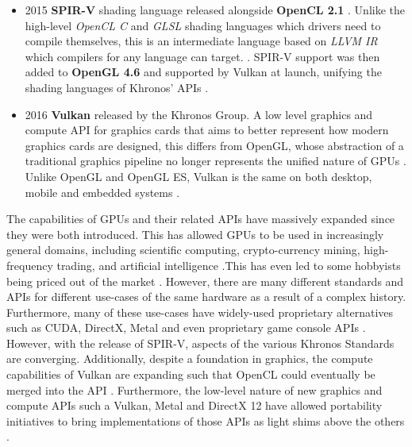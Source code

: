 \documentclass[a4paper,12pt,twoside,openright]{report}
\begin{document}
\begin{itemize}
    \item 2015 \textbf{SPIR-V} shading language released alongside
    \textbf{OpenCL 2.1} \cite{SPIRVLaunch}. Unlike the high-level
    \textit{OpenCL C} and \textit{GLSL} shading languages which drivers need to
    compile themselves, this is an intermediate language based on \textit{LLVM
    IR} which compilers for any language can target. \cite{LLVMIR}
    \cite{SPIRV}. SPIR-V support was then added to \textbf{OpenGL 4.6} and
    supported by Vulkan at launch, unifying the shading languages of Khronos'
    APIs \cite{SPIRVOpenGL}.

    \item 2016 \textbf{Vulkan} released by the Khronos Group. A low level
    graphics and compute API for graphics cards that aims to better represent
    how modern graphics cards are designed, this differs from OpenGL, whose
    abstraction of a traditional graphics pipeline no longer represents the
    unified nature of GPUs \cite{VulkanAnnouncement}. Unlike OpenGL and OpenGL
    ES, Vulkan is the same on both desktop, mobile and embedded systems
    \cite{Vulkan}.

\end{itemize}


The capabilities of GPUs and their related APIs have massively expanded since
they were both introduced. This has allowed GPUs to be used in increasingly
general domains, including scientific computing, crypto-currency mining,
high-frequency trading, and artificial intelligence \cite{GPUCrypto}
\cite{GPUScientificComputing} \cite{GPUTrading} \cite{GPUAI}.This has even led
to some hobbyists being priced out of the market \cite{GPUCrypto}
\cite{BitcoinRuiningPricing}. However, there are many different standards and
APIs for different use-cases of the same hardware as a result of a complex
history. Furthermore, many of these use-cases have widely-used proprietary
alternatives such as CUDA, DirectX, Metal and even proprietary game console
APIs \cite{CUDA} \cite{Metal} \cite{Direct3D} \cite{PS4PortCrew}. However, with
the release of SPIR-V, aspects of the various Khronos Standards are converging.
Additionally, despite a foundation in graphics, the compute capabilities of
Vulkan are expanding such that OpenCL could eventually be merged into the API
\cite{VulkanOpenCLMerge}. Furthermore, the low-level nature of new graphics and
compute APIs such a Vulkan, Metal and DirectX 12 have allowed portability
initiatives to bring implementations of those APIs as light shims above the
others \cite{VulkanPortabilityInitiative}
\cite{VulkanPortabilityInitiativeAnnouncement}.
\end{document}
